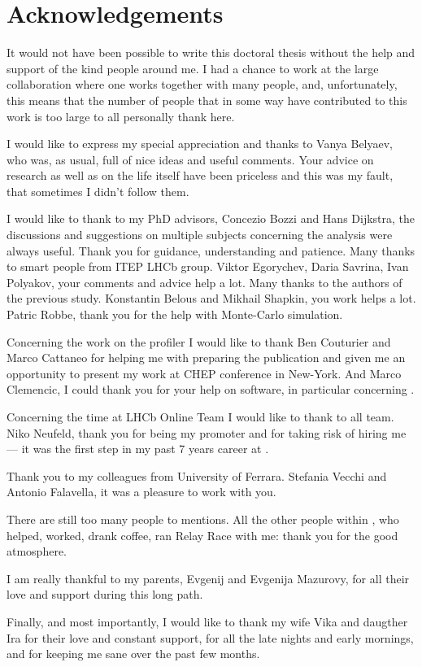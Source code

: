 \chapter*{Acknowledgements}
It would not have been possible to write this doctoral thesis without the help
and support of the kind people around me. I had a chance to work at the large
\lhcb collaboration where one works together with many people, and, unfortunately,
this means that the number of people that in some way have contributed to this
work is too large to all personally thank here.

I would like to express my special appreciation and thanks to Vanya Belyaev,
who was, as usual, full of nice ideas and useful comments. Your advice on
research as well as on the life itself have been priceless and this was my
fault, that sometimes I didn't follow them.

I would like to thank to my PhD advisors, Concezio Bozzi and Hans Dijkstra,
the discussions and suggestions on multiple subjects concerning the analysis
were always useful. Thank you for guidance, understanding and patience.
Many thanks to smart people from ITEP LHCb group. Viktor Egorychev, Daria Savrina,
Ivan Polyakov, your comments and advice help a lot. Many thanks to the authors
of the previous \chib study. Konstantin Belous and Mikhail Shapkin, you work
helps a lot. Patric Robbe, thank  you for the help with Monte-Carlo simulation.


Concerning the work on the profiler I would like to thank Ben Couturier and
Marco Cattaneo for helping me with preparing the publication and given me an
opportunity to present my work at CHEP conference in New-York. And Marco
Clemencic, I could thank you for your help on software, in particular
concerning \gaudi.

Concerning the time at LHCb Online Team I would like to thank to all
team. Niko Neufeld, thank you for being my promoter and for taking risk of 
hiring me --- it was the first step in my past 7 years career at \cern.

Thank you to my colleagues from University of Ferrara. Stefania Vecchi and
Antonio Falavella, it was a pleasure to work with you.

There are still too many people to mentions. All the other people within \lhcb,
who helped, worked, drank coffee, ran Relay Race with me: thank you for the
good atmosphere.

I am really thankful to my parents, Evgenij and Evgenija Mazurovy, for all
their love and support during this long path.

Finally, and most importantly, I would like to thank my wife Vika and daugther
Ira for their love and constant support, for all the late nights and early
mornings, and for keeping me sane over the past few months.

